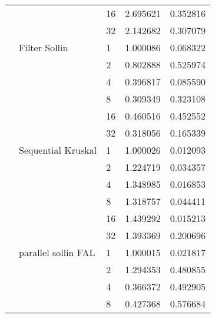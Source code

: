 \begin{tabular}{lllrr}
                                                       &                     & 16 &  2.695621 &  0.352816 \\
                                                       &                     & 32 &  2.142682 &  0.307079 \\
                                                       & Filter Sollin & 1  &  1.000086 &  0.068322 \\
                                                       &                     & 2  &  0.802888 &  0.525974 \\
                                                       &                     & 4  &  0.396817 &  0.085590 \\
                                                       &                     & 8  &  0.309349 &  0.323108 \\
                                                       &                     & 16 &  0.460516 &  0.452552 \\
                                                       &                     & 32 &  0.318056 &  0.165339 \\
                                                       & Sequential Kruskal & 1  &  1.000026 &  0.012093 \\
                                                       &                     & 2  &  1.224719 &  0.034357 \\
                                                       &                     & 4  &  1.348985 &  0.016853 \\
                                                       &                     & 8  &  1.318757 &  0.044411 \\
                                                       &                     & 16 &  1.439292 &  0.015213 \\
                                                       &                     & 32 &  1.393369 &  0.200696 \\
                                                       & parallel sollin FAL & 1  &  1.000015 &  0.021817 \\
                                                       &                     & 2  &  1.294353 &  0.480855 \\
                                                       &                     & 4  &  0.366372 &  0.492905 \\
                                                       &                     & 8  &  0.427368 &  0.576684 \\

\end{tabular}
